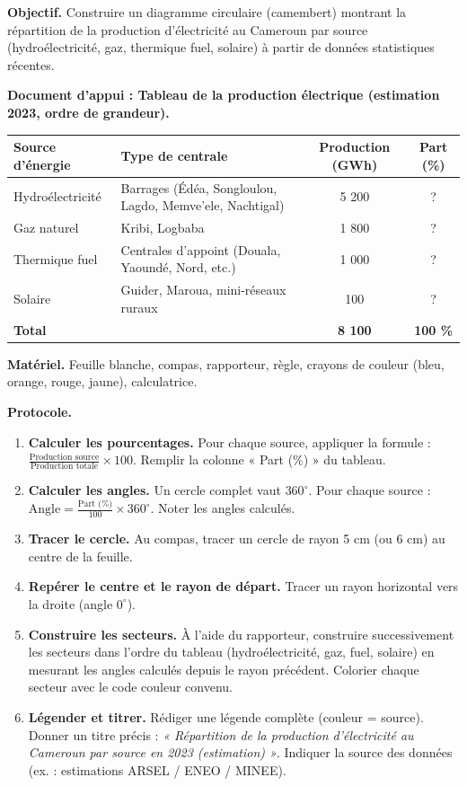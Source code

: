 \documentclass[11pt]{article}
\begin{document}
\begin{experience}
\textbf{Objectif.} Construire un diagramme circulaire (camembert) montrant la répartition de la production d'électricité au Cameroun par source (hydroélectricité, gaz, thermique fuel, solaire) à partir de données statistiques récentes.

\textbf{Document d'appui : Tableau de la production électrique (estimation 2023, ordre de grandeur).}
\begin{center}
\begin{tabularx}{\linewidth}{|l|X|c|c|}
\hline
\rowcolor{popblueL} \textbf{Source d'énergie} & \textbf{Type de centrale} & \textbf{Production (GWh)} & \textbf{Part (\%)} \\
\hline
Hydroélectricité & Barrages (Édéa, Songloulou, Lagdo, Memve'ele, Nachtigal) & 5 200 & ? \\
\hline
Gaz naturel & Kribi, Logbaba & 1 800 & ? \\
\hline
Thermique fuel & Centrales d'appoint (Douala, Yaoundé, Nord, etc.) & 1 000 & ? \\
\hline
Solaire & Guider, Maroua, mini-réseaux ruraux & 100 & ? \\
\hline
\textbf{Total} & & \textbf{8 100} & \textbf{100 \%} \\
\hline
\end{tabularx}
\end{center}

\textbf{Matériel.} Feuille blanche, compas, rapporteur, règle, crayons de couleur (bleu, orange, rouge, jaune), calculatrice.

\textbf{Protocole.}
\begin{enumerate}
\item \textbf{Calculer les pourcentages.} Pour chaque source, appliquer la formule : $\frac{\text{Production source}}{\text{Production totale}} \times 100$. Remplir la colonne « Part (\%) » du tableau.
\item \textbf{Calculer les angles.} Un cercle complet vaut $360^{\circ}$. Pour chaque source : $\text{Angle} = \frac{\text{Part (\%)}}{100} \times 360^{\circ}$. Noter les angles calculés.
\item \textbf{Tracer le cercle.} Au compas, tracer un cercle de rayon 5 cm (ou 6 cm) au centre de la feuille.
\item \textbf{Repérer le centre et le rayon de départ.} Tracer un rayon horizontal vers la droite (angle $0^{\circ}$).
\item \textbf{Construire les secteurs.} À l'aide du rapporteur, construire successivement les secteurs dans l'ordre du tableau (hydroélectricité, gaz, fuel, solaire) en mesurant les angles calculés depuis le rayon précédent. Colorier chaque secteur avec le code couleur convenu.
\item \textbf{Légender et titrer.} Rédiger une légende complète (couleur = source). Donner un titre précis : \emph{« Répartition de la production d'électricité au Cameroun par source en 2023 (estimation) »}. Indiquer la source des données (ex. : estimations ARSEL / ENEO / MINEE).
\end{enumerate}


\end{experience}
\end{document}
